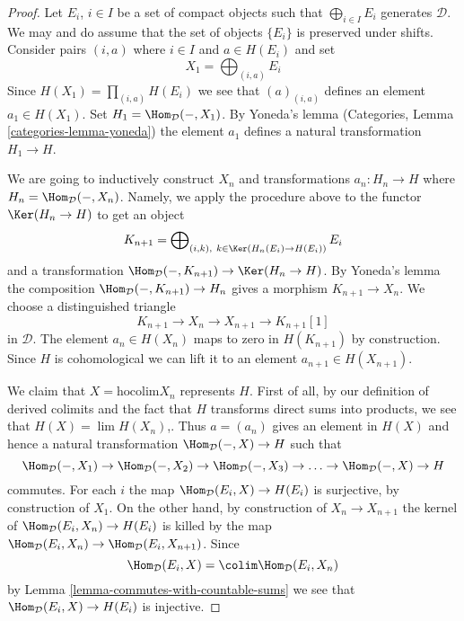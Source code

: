 \begin{proof}
Let $E_i$, $i \in I$ be a set of compact objects such that
$\bigoplus_{i \in I} E_i$ generates $\mathcal{D}$. We may and do assume
that the set of objects $\{E_i\}$ is preserved under shifts. Consider pairs
$(i, a)$ where $i \in I$ and $a \in H(E_i)$ and set
$$
X_1 = \bigoplus\nolimits_{(i, a)} E_i
$$
Since $H(X_1) = \prod_{(i, a)} H(E_i)$ we see that $(a)_{(i, a)}$
defines an element $a_1 \in H(X_1)$. Set $H_1 = \Hom_\mathcal{D}(- , X_1)$.
By Yoneda's lemma (Categories, Lemma \ref{categories-lemma-yoneda})
the element $a_1$ defines a natural transformation $H_1 \to H$.

\medskip\noindent
We are going to inductively construct $X_n$ and transformations
$a_n : H_n \to H$ where $H_n = \Hom_\mathcal{D}(-, X_n)$.
Namely, we apply the procedure
above to the functor $\Ker(H_n \to H)$ to get an object
$$
K_{n + 1} = \bigoplus\nolimits_{(i, k),\ k \in \Ker(H_n(E_i) \to H(E_i))} E_i
$$
and a transformation $\Hom_\mathcal{D}(-, K_{n + 1}) \to \Ker(H_n \to H)$.
By Yoneda's lemma the composition $\Hom_\mathcal{D}(-, K_{n + 1}) \to H_n$
gives a morphism $K_{n + 1} \to X_n$. We choose
a distinguished triangle
$$
K_{n + 1} \to X_n \to X_{n + 1} \to K_{n + 1}[1]
$$
in $\mathcal{D}$. The element $a_n \in H(X_n)$ maps to zero
in $H(K_{n + 1})$ by construction. Since $H$ is cohomological
we can lift it to an element $a_{n + 1} \in H(X_{n + 1})$.

\medskip\noindent
We claim that $X = \text{hocolim} X_n$ represents $H$.
First of all, by our definition of derived colimits
and the fact that $H$ transforms direct sums into products,
we see that $H(X) = \lim H(X_n)$,. Thus $a = (a_n)$ gives
an element in $H(X)$ and hence a natural transformation
$\Hom_\mathcal{D}(- , X) \to H$ such that
$$
\Hom_\mathcal{D}(-, X_1) \to
\Hom_\mathcal{D}(-, X_2) \to
\Hom_\mathcal{D}(-, X_3) \to \ldots \to
\Hom_\mathcal{D}(-, X) \to H
$$
commutes. For each $i$ the map $\Hom_\mathcal{D}(E_i, X) \to H(E_i)$
is surjective, by construction of $X_1$. On the other hand, by construction
of $X_n \to X_{n + 1}$ the kernel of $\Hom_\mathcal{D}(E_i, X_n) \to H(E_i)$
is killed by the map
$\Hom_\mathcal{D}(E_i, X_n) \to \Hom_\mathcal{D}(E_i, X_{n + 1})$.
Since
$$
\Hom_\mathcal{D}(E_i, X) = \colim \Hom_\mathcal{D}(E_i, X_n)
$$
by Lemma \ref{lemma-commutes-with-countable-sums}
we see that $\Hom_\mathcal{D}(E_i, X) \to H(E_i)$ is injective.


\end{proof}
